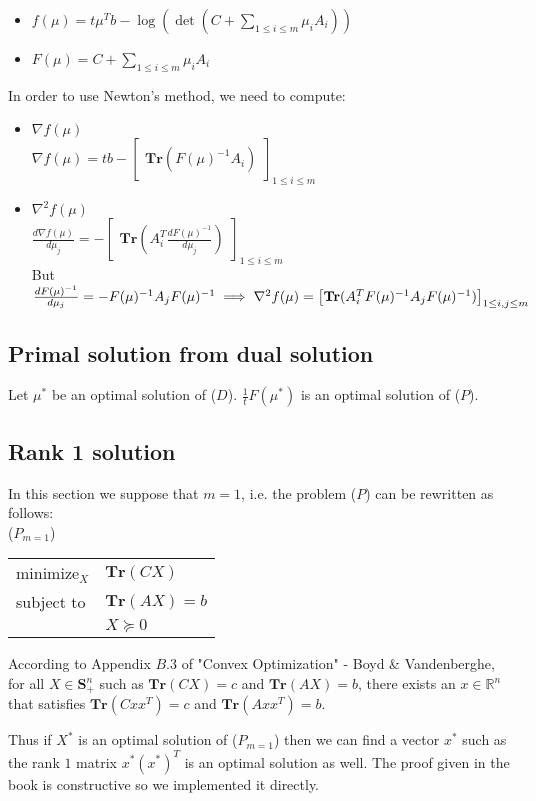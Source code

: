 \documentclass{article}
\begin{document}
\begin{itemize}
	\item $f(\mu) = t \mu^T b - \log(\det(C + \sum_{1 \leq i \leq m} \mu_i A_i))$
	\item $F(\mu) = C + \sum_{1 \leq i \leq m} \mu_i A_i$
\end{itemize}

In order to use Newton's method, we need to compute: \begin{itemize}
	\item $\nabla f(\mu)$ \\
	$\nabla f(\mu) = t b - \begin{bmatrix}
	\mathbf{Tr}(F(\mu)^{-1} A_i)
	\end{bmatrix}_{1 \leq i \leq m}$
	\item $\nabla^2 f(\mu)$ \\
	$\frac{d \nabla f(\mu)}{d \mu_j} = - \begin{bmatrix}
	\mathbf{Tr}(A_i^T \frac{d F(\mu)^{-1}}{d \mu_j})
	\end{bmatrix}_{1 \leq i \leq m}$ \\
	But $\frac{d F(\mu)^{-1}}{d \mu_j} = - F(\mu)^{-1} A_j F(\mu)^{-1} \\
	\implies \nabla^2 f(\mu) = \begin{bmatrix}
	\mathbf{Tr}(A_i^T F(\mu)^{-1} A_j F(\mu)^{-1})
	\end{bmatrix}_{1 \leq i, j \leq m}$
\end{itemize}

\subsection{Primal solution from dual solution}

Let $\mu^*$ be an optimal solution of ($D$). $\frac{1}{t} F(\mu^*)$ is an optimal solution of ($P$).

\subsection{Rank 1 solution}

In this section we suppose that $m = 1$, i.e. the problem ($P$) can be rewritten as follows: \\
($P_{m = 1}$)\begin{tabular}{l l}
	minimize$_{X}$ & $\mathbf{Tr}(C X)$ \\
	subject to & $\mathbf{Tr}(A X) = b$ \\
	& $X \succeq 0$  
\end{tabular}

According to Appendix $B.3$ of "Convex Optimization" - Boyd \& Vandenberghe, for all $X \in \mathbf{S}^n_+$ such as $\mathbf{Tr}(C X) = c$ and $\mathbf{Tr}(A X) = b$, there exists an $x \in \mathbb{R}^n$ that satisfies $\mathbf{Tr}(C x x^T) = c$ and $\mathbf{Tr}(A x x^T) = b$. 

Thus if $X^*$ is an optimal solution of ($P_{m = 1}$) then we can find a vector $x^*$ such as the rank $1$ matrix $x^* (x^*)^T$ is an optimal solution as well. The proof given in the book is constructive so we implemented it directly.
\end{document}
